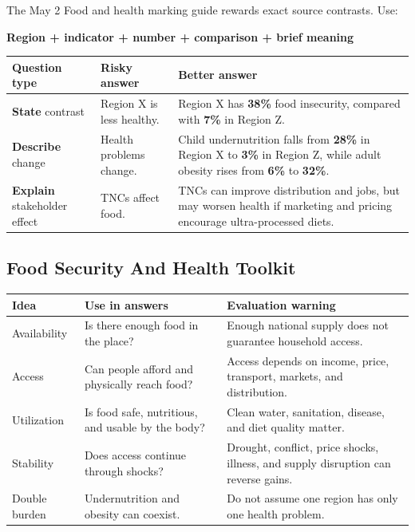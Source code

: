 \documentclass[11pt,a4paper]{article}
\newcommand{\term}[1]{\textcolor{HeadingBlue}{\textbf{#1}}}
\newcommand{\exam}[1]{\textcolor{AccentTeal}{\textbf{#1}}}
\begin{document}
The May 2 Food and health marking guide rewards exact source contrasts. Use:

\begin{center}
{\sffamily\bfseries\color{HeadingBlue}
Region + indicator + number + comparison + brief meaning}
\end{center}

\begin{tabularx}{\textwidth}{L{0.24\textwidth}Y Y}
\toprule
\textbf{Question type} & \textbf{Risky answer} & \textbf{Better answer} \\
\midrule
\exam{State} contrast & Region X is less healthy. & Region X has
\term{38\%} food insecurity, compared with \term{7\%} in Region Z. \\
\exam{Describe} change & Health problems change. & Child undernutrition falls
from \term{28\%} in Region X to \term{3\%} in Region Z, while adult obesity
rises from \term{6\%} to \term{32\%}. \\
\exam{Explain} stakeholder effect & TNCs affect food. & TNCs can improve
distribution and jobs, but may worsen health if marketing and pricing
encourage ultra-processed diets. \\
\bottomrule
\end{tabularx}

\subsection{Food Security And Health Toolkit}

\begin{tabularx}{\textwidth}{L{0.22\textwidth}Y Y}
\toprule
\textbf{Idea} & \textbf{Use in answers} & \textbf{Evaluation warning} \\
\midrule
Availability & Is there enough food in the place? & Enough national supply
does not guarantee household access. \\
Access & Can people afford and physically reach food? & Access depends on
income, price, transport, markets, and distribution. \\
Utilization & Is food safe, nutritious, and usable by the body? & Clean water,
sanitation, disease, and diet quality matter. \\
Stability & Does access continue through shocks? & Drought, conflict, price
shocks, illness, and supply disruption can reverse gains. \\
Double burden & Undernutrition and obesity can coexist. & Do not assume one
region has only one health problem. \\
\bottomrule
\end{tabularx}
\end{document}
